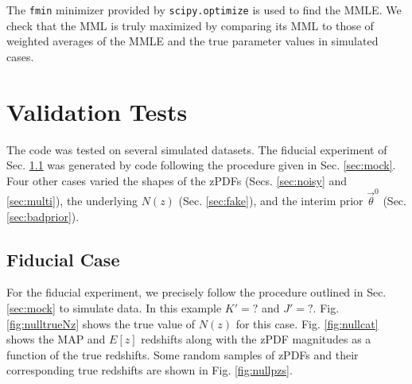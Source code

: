 \documentclass[preprint]{aastex}
\begin{document}
The \texttt{fmin} minimizer provided by \texttt{scipy.optimize} is used to find 
the MMLE.  We check that the MML is truly maximized by comparing its MML to 
those of weighted averages of the MMLE and the true parameter values in 
simulated cases.

\clearpage
\section{Validation Tests}
\label{sec:valid}

The code was tested on several simulated datasets.  The fiducial experiment of 
Sec. \ref{sec:null} was generated by code following the procedure given in Sec. 
\ref{sec:mock}.  Four other cases varied the shapes of the zPDFs (Secs. 
\ref{sec:noisy} and \ref{sec:multi}), the underlying $N(z)$ (Sec. 
\ref{sec:fake}), and the interim prior $\vec{\theta}^{0}$ (Sec. 
\ref{sec:badprior}).  

\clearpage
\subsection{Fiducial Case}
\label{sec:null}

For the fiducial experiment, we precisely follow the procedure outlined in Sec. 
\ref{sec:mock} to simulate data.  In this example $K'=?$ and $J'=?$.  Fig. 
\ref{fig:nulltrueNz} shows the true value of $N(z)$ for this case.  Fig. 
\ref{fig:nullcat} shows the MAP and $E[z]$ redshifts along with the zPDF 
magnitudes as a function of the true redshifts.  Some random samples of zPDFs 
and their corresponding true redshifts are shown in Fig. \ref{fig:nullpzs}.
\end{document}
